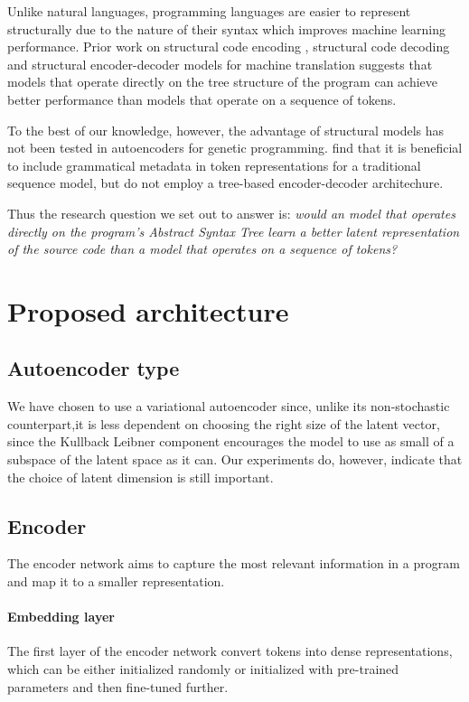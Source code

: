 Unlike natural languages, programming languages are easier to represent structurally due to the nature of their syntax which improves machine learning performance.
Prior work on structural code encoding \cite{alon2019structural,zhang2015tree}, structural code decoding \cite{jiang2021ast,zhu2019grammarcnn} and structural encoder-decoder models for machine translation \cite{chen2018tree} suggests that models that operate directly on the tree structure of the program can achieve better performance than models that operate on a sequence of tokens.

To the best of our knowledge, however, the advantage of structural models has not been tested in autoencoders for genetic programming. \cite{kusner2017grammar,grammar-vae} find that it is beneficial to include grammatical metadata in token representations for a traditional sequence model, but do not employ a tree-based encoder-decoder architechure.

Thus the research question we set out to answer is: \emph{would an model that operates directly on the program's Abstract Syntax Tree learn a better latent representation of the source code than a model that operates on a sequence of tokens?}

\section{Proposed architecture}


\subsection{Autoencoder type}
We have chosen to use a variational autoencoder \cite{kingma2013auto} since, unlike its non-stochastic counterpart,it is less dependent on choosing the right size of the latent vector, since the Kullback Leibner component encourages the model to use as small of a subspace of the latent space as it can.
Our experiments do, however, indicate that the choice of latent dimension is still important.

\subsection{Encoder}
The encoder network aims to capture the most relevant information in a program and map it to a smaller representation. 



\paragraph{Embedding layer} The first layer of the encoder network convert tokens into dense representations, which can be either initialized randomly or initialized with pre-trained parameters and then fine-tuned further.



